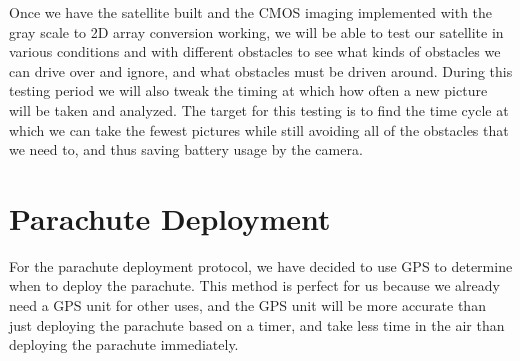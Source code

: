 \documentclass[10pt,letterpaper,onecolumn,journal]{IEEEtran}
\begin{document}
\par
Once we have the satellite built and the CMOS imaging implemented with the gray scale to 2D array conversion working, we will be able to test our satellite in various conditions and with different obstacles to see what kinds of obstacles we can drive over and ignore, and what obstacles must be driven around. During this testing period we will also tweak the timing at which how often a new picture will be taken and analyzed. The target for this testing is to find the time cycle at which we can take the fewest pictures while still avoiding all of the obstacles that we need to, and thus saving battery usage by the camera.
\section{Parachute Deployment}
For the parachute deployment protocol, we have decided to use GPS to determine when to deploy the parachute. This method is perfect for us because we already need a GPS unit for other uses, and the GPS unit will be more accurate than just deploying the parachute based on a timer, and take less time in the air than deploying the parachute immediately.\vspace{.3cm}
\par
\end{document}
